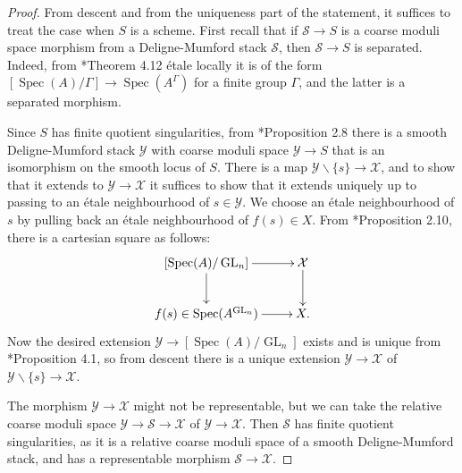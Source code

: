 \documentclass{amsart}
\newcommand{\cS}{\mathcal{S}}
\newcommand{\cX}{\mathcal{X}}
\newcommand{\cY}{\mathcal{Y}}
\newcommand{\spec}{\operatorname{Spec}}
\newcommand{\GL}{\operatorname{GL}}
\theoremstyle{definition}
\theoremstyle{definition}
\begin{document}
{\begin{proof}From descent and from the uniqueness part of the statement, it suffices to treat the case when $S$ is a scheme. First recall that if $\cS\to S$ is a coarse moduli space morphism from a Deligne-Mumford stack $\cS$, then $\cS\to S$ is separated. Indeed, from \cite{luna}*{Theorem 4.12}  \'etale locally  it is of the form $[\spec(A)/\Gamma]\to \spec(A^\Gamma)$ for a finite group $\Gamma$,  and the latter is a separated morphism.

Since $S$ has finite quotient singularities, from \cite{Vis}*{Proposition 2.8} there is a smooth Deligne-Mumford stack $\cY$ with coarse moduli space $\cY\to S$ that is an isomorphism on the smooth locus of $S$.
There is a map $\cY\smallsetminus\{s\}\to \cX$, and to show that it extends to $\cY\to \cX$ it suffices to show that it extends uniquely up to passing to an \'etale neighbourhood of $s\in \cY$. We choose an \'etale neighbourhood of $s$ by pulling back an \'etale neighbourhood of $f(s)\in X$. From \cite{AHH}*{Proposition 2.10}, there is a cartesian square as follows:
\[
\xymatrix{[\spec(A)/\GL_n]\ar[r]\ar[d] & \cX\ar[d] \\ f(s)\in \spec(A^{\GL_n})\ar[r] & X.}
\]
Now the desired extension $\cY\to [\spec(A)/\GL_n]$ exists and is unique from \cite{dli1}*{Proposition 4.1}, so from descent there is a unique extension $\cY\to \cX$ of $\cY\smallsetminus \{s\}\to \cX$.

The morphism $\cY\to \cX$ might not be representable, but we can take the relative coarse moduli space $\cY\to \cS\to \cX$ of $\cY\to \cX$. Then $\cS$ has finite quotient singularities, as it is a relative coarse moduli space of a smooth Deligne-Mumford stack, and has a representable morphism $\cS\to 
\cX$. 


\end{proof}}
\end{document}
